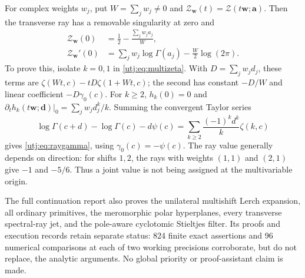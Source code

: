 For complex weights $w_j$, put $W=\sum_jw_j\ne0$ and
$\mathcal Z_{\boldsymbol w}(t)=\mathcal Z(t\boldsymbol w;\boldsymbol a)$.
Then the transverse ray has a removable singularity at zero and
\begin{align}
 \mathcal Z_{\boldsymbol w}(0)
   &=\frac12-\frac{\sum_jw_ja_j}{W},\label{utj:eq:rayvalue}\\
 \mathcal Z_{\boldsymbol w}'(0)
   &=\sum_jw_j\log\Gamma(a_j)-\frac W2\log(2\pi).
 \label{utj:eq:raygamma}
\end{align}
To prove this, isolate $k=0,1$ in \eqref{utj:eq:multizeta}. With
$D=\sum_jw_jd_j$, these terms are
$\zeta(Wt,c)-tD\zeta(1+Wt,c)$; the second has constant $-D/W$
and linear coefficient $-D\gamma_0(c)$. For $k\ge2$,
$h_k(0)=0$ and $\partial_t h_k(t\boldsymbol w;\boldsymbol d)|_0
 =\sum_jw_jd_j^k/k$. Summing the convergent Taylor series
\[
 \log\Gamma(c+d)-\log\Gamma(c)-d\psi(c)
    =\sum_{k\ge2}\frac{(-1)^kd^k}{k}\zeta(k,c)
\]
gives \eqref{utj:eq:raygamma}, using $\gamma_0(c)=-\psi(c)$.
The ray value generally depends on direction: for shifts $1,2$, the
rays with weights $(1,1)$ and $(2,1)$ give $-1$ and $-5/6$.
Thus a joint value is not being assigned at the multivariable origin.

The full continuation report also proves the unilateral multishift
Lerch expansion, all ordinary primitives, the meromorphic polar
hyperplanes, every transverse spectral-ray jet, and the pole-aware
cyclotomic Stieltjes filter. Its proofs and execution records retain
separate status: 824 finite exact assertions and 96 numerical comparisons
at each of two working precisions corroborate, but do not replace, the
analytic arguments. No global priority or proof-assistant claim is made.

